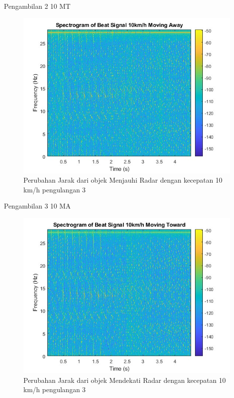 Pengambilan 2 10 MT

\begin{figure}
	\centering
	\includegraphics[scale=0.6]{pics/bab5/Velocity/3_10MA.jpg}
	\caption{Perubahan Jarak dari objek Menjauhi Radar dengan kecepatan 10 km/h pengulangan 3}
	\label{fig:pengambilan3_10MA}
\end{figure}

Pengambilan 3 10 MA

\begin{figure}
	\centering
	\includegraphics[scale=0.6]{pics/bab5/Velocity/3_10MT.jpg}
	\caption{Perubahan Jarak dari objek Mendekati Radar dengan kecepatan 10 km/h pengulangan 3}
	\label{fig:pengambilan3_10MT}
\end{figure}

